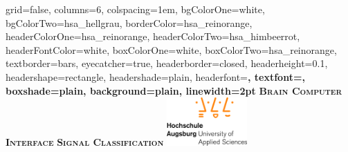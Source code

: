 \documentclass[landscape,final,a1paper,fontscale=0.4]{../baposter/baposter}
\begin{document}



\begin{poster}%
  {
  grid=false,
  columns=6,
  colspacing=1em,
  bgColorOne=white,
  bgColorTwo=hsa_hellgrau,
  borderColor=hsa_reinorange,
  headerColorOne=hsa_reinorange,
  headerColorTwo=hsa_himbeerrot,
  headerFontColor=white,
  boxColorOne=white,
  boxColorTwo=hsa_reinorange,
  textborder=bars,
  eyecatcher=true,
  headerborder=closed,
  headerheight=0.1\textheight,
  headershape=rectangle,
  headershade=plain,
  headerfont=\Large\bf\sc, %
  textfont={\sf\setlength{\parindent}{1.5em}},
  boxshade=plain,
  background=plain,
  linewidth=2pt
  }
  {
  } 
  {\bf\textsc{Brain Computer Interface}\vspace{0.5em}}
  {\bf\textsc{Signal Classification}\vspace{0.5em}}
  {%
    \includegraphics[height=5em]{images/hsa_logo_normal.jpg}
  }	


\end{poster}
\end{document}
